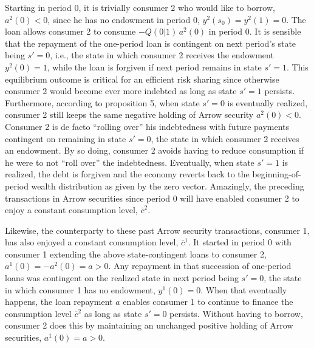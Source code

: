 Starting in period 0, it is trivially consumer 2
who would like to borrow, $a^2(0)<0$, since he 
has no endowment in period 0, $y^2(s_0)=y^2(1)=0$.
The loan allows consumer 2 to consume
$-Q(0 | 1)\, a^2(0)$ in period 0. It is sensible 
that the repayment of the one-period loan is
contingent on next period's state being
$s'=0$, i.e., the state in which consumer 2 
receives the endowment $y^2(0)=1$, while the
loan is forgiven if next period remains in
state $s'=1$. This equilibrium outcome is 
critical for an efficient risk sharing since
otherwise consumer 2 would become ever more
indebted as long as state $s'=1$ persists.
Furthermore, according to proposition 5, 
when state $s'=0$ is eventually realized, 
consumer 2 still keeps the same negative 
holding of Arrow security $a^2(0)<0$.
Consumer 2 is de facto ``rolling over''
his indebtedness with future payments
contingent on remaining in state $s'=0$, the state
in which consumer 2 receives an endowment. By 
so doing, consumer 2 avoids having to reduce
consumption if he were to not ``roll over'' 
the indebtedness. Eventually, when state $s'=1$ 
is realized, the debt is forgiven and the 
economy reverts back to the beginning-of-period 
wealth distribution as given by
the zero vector. Amazingly, the preceding 
transactions in Arrow securities since period 0 
will have enabled consumer 2 to enjoy a constant 
consumption level, $\bar c^2$.

Likewise, the counterparty to these past Arrow
security transactions, consumer 1, has
also enjoyed a constant consumption level,
$\bar c^1$. It started in period 0 with
consumer 1 extending the above state-contingent 
loans to consumer 2, $a^1(0)=-a^2(0)=a >0$.
Any repayment in that succession of 
one-period loans was contingent on the
realized state in next period being $s'=0$, the
state in which consumer 1 has no endowment,
$y^1(0)=0$. When that eventually happens, 
the loan repayment $a$ enables consumer 1 
to continue to finance the consumption level 
$\bar c^2$ as long as state $s'=0$ persists. 
Without having to borrow, consumer 2 does this 
by maintaining an unchanged positive holding of 
Arrow securities, $a^1(0)=a>0$. 

